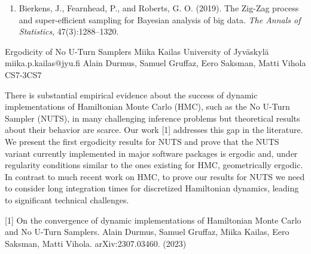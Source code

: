 \begin{talk}
\medskip
    
    \begin{enumerate}
      \item[{[1]}] Bierkens, J., Fearnhead, P., and Roberts, G. O. (2019). The Zig-Zag process and super-efficient sampling for Bayesian analysis of big data. {\it The Annals of Statistics}, 47(3):1288–1320.
    \end{enumerate}

\end{talk}

\begin{talk}
  {Ergodicity of No U-Turn Samplers}%
  {Miika Kailas}%
  {University of Jyväskylä}%
  {miika.p.kailas@jyu.fi}%
  {Alain Durmus, Samuel Gruffaz, Eero Saksman, Matti Vihola}%
{}{}{CS7-3}{CS7}


				
				

There is substantial empirical evidence about the success of dynamic implementations of Hamiltonian Monte Carlo (HMC), such as the No U-Turn Sampler (NUTS), in many challenging inference problems but theoretical results about their behavior are scarce.
Our work [1] addresses this gap in the literature.
We present the first ergodicity results for NUTS and prove that the NUTS variant currently implemented in major software packages is ergodic and, under regularity conditions similar to the ones existing for HMC, geometrically ergodic.
In contrast to much recent work on HMC, to prove our results for NUTS we need to consider long integration times for discretized Hamiltonian dynamics, leading to significant technical challenges.

\medskip

[1] On the convergence of dynamic implementations of Hamiltonian Monte Carlo and No U-Turn Samplers. Alain Durmus, Samuel Gruffaz, Miika Kailas, Eero Saksman, Matti Vihola. arXiv:2307.03460. (2023)
\end{talk}

